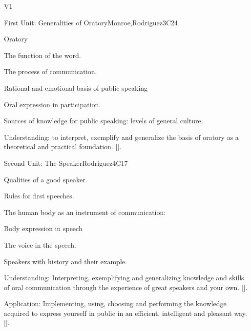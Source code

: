 \begin{syllabus}
\begin{competences}{V1}
    \item {}
    \item {}
\end{competences}

\begin{unit}{}{First Unit: Generalities of Oratory}{Monroe,Rodriguez}{3}{C24}
\begin{topics}
	\item Oratory
	\item The function of the word.
	\item The process of communication.
	\item Rational and emotional basis of public speaking
		\begin{subtopics}
			\item Oral expression in participation.
		\end{subtopics}

	\item Sources of knowledge for public speaking: levels of general culture.
\end{topics}
\begin{learningoutcomes}
	\item Understanding: to interpret, exemplify and generalize the basis of oratory as a theoretical and practical foundation. [\Usage].
\end{learningoutcomes}
\end{unit}

\begin{unit}{}{Second Unit: The Speaker}{Rodriguez}{4}{C17}
\begin{topics}
	\item Qualities of a good speaker.
	\item Rules for first speeches.
	\item The human body as an instrument of communication:
		\begin{subtopics}
			\item Body expression in speech
			\item The voice in the speech.
	   	\end{subtopics}
	\item Speakers with history and their example.
\end{topics}
\begin{learningoutcomes}
	\item Understanding: Interpreting, exemplifying and generalizing knowledge and skills of oral communication through the experience of great speakers and your own. [\Usage].
	\item Application: Implementing, using, choosing and performing the knowledge acquired to express yourself in public in an efficient, intelligent and pleasant way. [\Usage].
\end{learningoutcomes}
\end{unit}


\end{syllabus}

